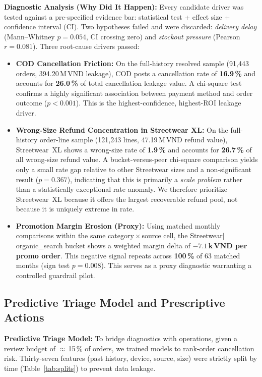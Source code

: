 \documentclass[10pt]{article}
\begin{document}
\textbf{Diagnostic Analysis (Why Did It Happen):}
Every candidate driver was tested against a pre-specified evidence bar: statistical test + effect size + confidence interval (CI). Two hypotheses failed and were discarded: \textit{delivery delay} (Mann--Whitney $p\!=\!0.054$, CI crossing zero) and \textit{stockout pressure} (Pearson $r\!=\!0.081$). Three root-cause drivers passed:
\begin{itemize}
    \item \textbf{COD Cancellation Friction:} On the full-history resolved sample (91{,}443 orders, 394.20\,M\,VND leakage), COD posts a cancellation rate of \textbf{16.9\,\%} and accounts for \textbf{26.0\,\%} of total cancellation leakage value. A chi-square test confirms a highly significant association between payment method and order outcome ($p\!<\!0.001$). This is the highest-confidence, highest-ROI leakage driver.
    \item \textbf{Wrong-Size Refund Concentration in Streetwear XL:} On the full-history order-line sample (121{,}243 lines, 47.19\,M\,VND refund value), Streetwear~XL shows a wrong-size rate of \textbf{1.9\,\%} and accounts for \textbf{26.7\,\%} of all wrong-size refund value. A bucket-versus-peer chi-square comparison yields only a small rate gap relative to other Streetwear sizes and a non-significant result ($p = 0.367$), indicating that this is primarily a \emph{scale problem} rather than a statistically exceptional rate anomaly. We therefore prioritize Streetwear~XL because it offers the largest recoverable refund pool, not because it is uniquely extreme in rate.
    \item \textbf{Promotion Margin Erosion (Proxy):} Using matched monthly comparisons within the same category\,$\times$\,source cell, the Streetwear$|$organic\_search bucket shows a weighted margin delta of $\boldsymbol{-7.1}$\,\textbf{k\,VND per promo order}. This negative signal repeats across \textbf{100\,\%} of 63 matched months (sign test $p\!=\!0.008$). This serves as a proxy diagnostic warranting a controlled guardrail pilot.
\end{itemize}

\subsection{Predictive Triage Model and Prescriptive Actions}
\textbf{Predictive Triage Model:} To bridge diagnostics with operations, given a review budget of $\approx$\,15\,\% of orders, we trained models to rank-order cancellation risk. Thirty-seven features (past history, device, source, size) were strictly split by time (Table~\ref{tab:splits}) to prevent data leakage.
\end{document}
